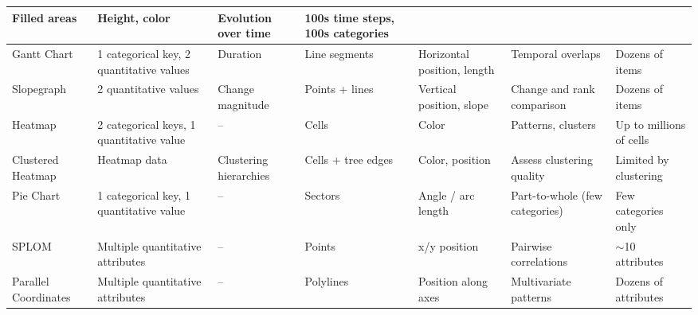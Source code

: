 \begin{exercise}
\begin{center}
{\begin{tabular}{|l|l|l|l|l|l|l|}
        Filled areas &
        Height, color &
        Evolution over time &
        100s time steps, 100s categories \\
        \hline
        Gantt Chart &
        1 categorical key, 2 quantitative values &
        Duration &
        Line segments &
        Horizontal position, length &
        Temporal overlaps &
        Dozens of items \\
        \hline
        Slopegraph &
        2 quantitative values &
        Change magnitude &
        Points + lines &
        Vertical position, slope &
        Change and rank comparison &
        Dozens of items \\
        \hline
        Heatmap &
        2 categorical keys, 1 quantitative value &
        -- &
        Cells &
        Color &
        Patterns, clusters &
        Up to millions of cells \\
        \hline
        Clustered Heatmap &
        Heatmap data &
        Clustering hierarchies &
        Cells + tree edges &
        Color, position &
        Assess clustering quality &
        Limited by clustering \\
        \hline
        Pie Chart &
        1 categorical key, 1 quantitative value &
        -- &
        Sectors &
        Angle / arc length &
        Part-to-whole (few categories) &
        Few categories only \\
        \hline
        SPLOM &
        Multiple quantitative attributes &
        -- &
        Points &
        x/y position &
        Pairwise correlations &
        $\sim$10 attributes \\
        \hline
        Parallel Coordinates &
        Multiple quantitative attributes &
        -- &
        Polylines &
        Position along axes &
        Multivariate patterns &
        Dozens of attributes \\
        \hline
        \end{tabular}
        }
    \end{center}
    \end{exercise}
    
